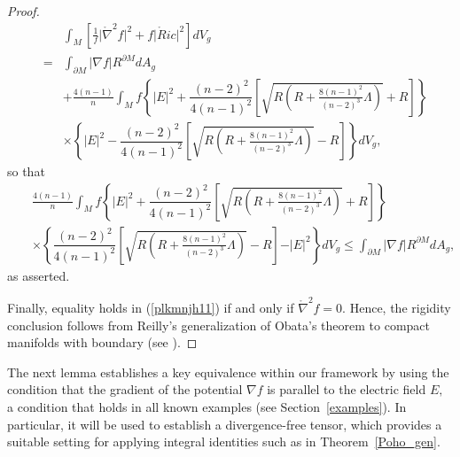 \documentclass{amsart}
\numberwithin{equation}{section}
\begin{document}
\begin{proof}
		\begin{eqnarray}\label{prop2eqb}
			&&	\int_{M}\left[\frac{1}{f}\vert\mathring{\nabla}^2f\vert^{2} + f\vert\mathring{R}ic\vert^{2}\right]dV_{g}\nonumber\\
			&=&
			\int_{\partial M}\vert\nabla f\vert R^{\partial M} dA_{g} \nonumber\\
			&&+ \frac{4(n-1)}{n}\int_{M}f\left\{\vert E\vert^{2} +  \dfrac{(n-2)^2}{4(n - 1)^2}\left[\sqrt{R\left(R + \frac{8(n-1)^2}{(n-2)^3}\Lambda\right)} +R\right]\right\}\nonumber\\
			&&\times\left\{\vert E\vert^{2} -  \dfrac{(n-2)^2}{4(n - 1)^2}\left[\sqrt{R\left(R + \frac{8(n-1)^2}{(n-2)^3}\Lambda\right)} - R\right]\right\}dV_{g},
		\end{eqnarray} so that
		\begin{eqnarray}
		\label{plkmnjh11}
			&& \frac{4(n-1)}{n}\int_{M}f\left\{\vert E\vert^{2} +  \dfrac{(n-2)^2}{4(n - 1)^2}\left[\sqrt{R\left(R + \frac{8(n-1)^2}{(n-2)^3}\Lambda\right)} +R\right]\right\}\nonumber\\
			&&\times\left\{\dfrac{(n-2)^2}{4(n - 1)^2}\left[\sqrt{R\left(R + \frac{8(n-1)^2}{(n-2)^3}\Lambda\right)} - R\right] -\vert E\vert^{2} \right\}dV_{g}\leq 	\int_{\partial M}\vert\nabla f\vert R^{\partial M} dA_{g},
		\end{eqnarray} as asserted. 
		
		
Finally, equality holds in (\ref{plkmnjh11})  if and only if $\mathring{\nabla}^2 f = 0.$ Hence, the rigidity conclusion follows from Reilly’s generalization of Obata’s theorem to compact manifolds with boundary (see \cite[Lemma 3]{reilly2}).

\end{proof}	
	
	
	
	
	
	
	
The next lemma establishes a key equivalence within our framework by using the condition that the gradient of the potential \(\nabla f\) is parallel to the electric field $E,$ a condition that holds in all known examples (see Section~\ref{examples}). In particular, it will be used to establish a divergence-free tensor, which provides a suitable setting for applying integral identities such as in Theorem~\ref{Poho_gen}.
\end{document}
